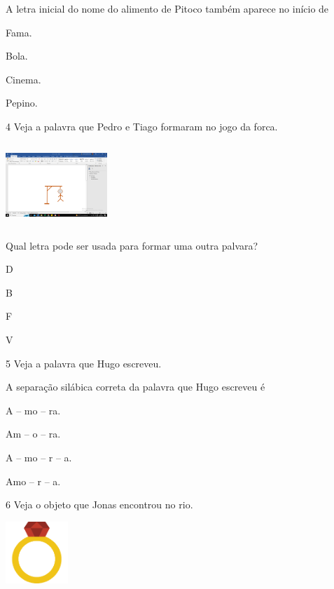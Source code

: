 A letra inicial do nome do alimento de Pitoco também aparece no início de

\begin{escolha}
\item Fama.

\item Bola.

\item Cinema.

\item Pepino.
\end{escolha}

\num{4} Veja a palavra que Pedro e Tiago formaram no jogo da forca.

\includegraphics[width=1.50909in,height=1.22355in]{media/image150.png}

Qual letra pode ser usada para formar uma outra palvara?

\begin{escolha}
\item D

\item B

\item F

\item V
\end{escolha}

\num{5} Veja a palavra que Hugo escreveu.

A separação silábica correta da palavra que Hugo escreveu é

\begin{escolha}
\item A -- mo -- ra.

\item Am -- o -- ra.

\item A -- mo -- r -- a.

\item Amo -- r -- a.
\end{escolha}

\num{6} Veja o objeto que Jonas encontrou no rio.

\includegraphics[width=0.92222in,height=0.92222in]{media/image151.png}

